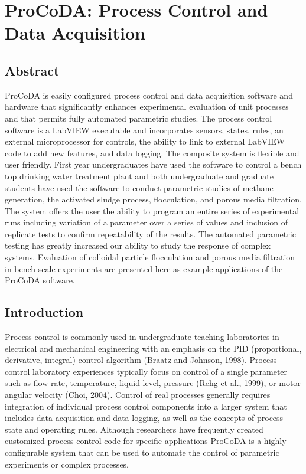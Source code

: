 \documentclass[letterpaper,10pt,english]{sphinxmanual}
\begin{document}
\chapter{ProCoDA: Process Control and Data Acquisition}
\label{\detokenize{ProCoDA/ProCoDA:procoda-process-control-and-data-acquisition}}\label{\detokenize{ProCoDA/ProCoDA:title-procoda}}\label{\detokenize{ProCoDA/ProCoDA::doc}}

\section{Abstract}
\label{\detokenize{ProCoDA/ProCoDA:abstract}}
ProCoDA is easily configured process control and data acquisition software and hardware that significantly enhances experimental evaluation of unit processes and that permits fully automated parametric studies. The process control software is a LabVIEW executable and incorporates sensors, states, rules, an external microprocessor for controls, the ability to link to external LabVIEW code to add new features, and data logging. The composite system is flexible and user friendly. First year undergraduates have used the software to control a bench top drinking water treatment plant and both undergraduate and graduate students have used the software to conduct parametric studies of methane generation, the activated sludge process, flocculation, and porous media filtration. The system offers the user the ability to program an entire series of experimental runs including variation of a parameter over a series of values and inclusion of replicate tests to confirm repeatability of the results. The automated parametric testing has greatly increased our ability to study the response of complex systems. Evaluation of colloidal particle flocculation and porous media filtration in bench-scale experiments are presented here as example applications of the ProCoDA software.


\section{Introduction}
\label{\detokenize{ProCoDA/ProCoDA:introduction}}
Process control is commonly used in undergraduate teaching laboratories in electrical and mechanical engineering with an emphasis on the PID (proportional, derivative, integral) control algorithm (Braatz and Johnson, 1998). Process control laboratory experiences typically focus on control of a single parameter such as flow rate, temperature, liquid level, pressure (Rehg et al., 1999), or motor angular velocity (Choi, 2004). Control of real processes generally requires integration of individual process control components into a larger system that includes data acquisition and data logging, as well as the concepts of process state and operating rules. Although researchers have frequently created customized process control code for specific applications ProCoDA is a highly configurable system that can be used to automate the control of parametric experiments or complex processes.
\end{document}
